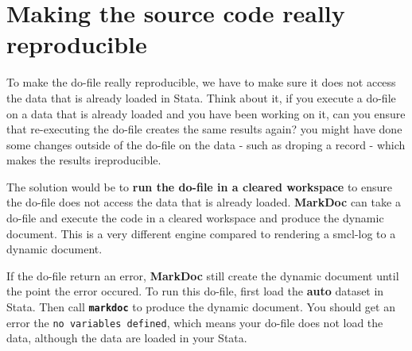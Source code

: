 \documentclass{article}
\begin{document}
\section{Making the source code really
reproducible}\label{making-the-source-code-really-reproducible}

To make the do-file really reproducible, we have to make sure it does
not access the data that is already loaded in Stata. Think about it, if
you execute a do-file on a data that is already loaded and you have been
working on it, can you ensure that re-executing the do-file creates the
same results again? you might have done some changes outside of the
do-file on the data - such as droping a record - which makes the results
ireproducible.

The solution would be to \textbf{run the do-file in a cleared workspace}
to ensure the do-file does not access the data that is already loaded.
\textbf{MarkDoc} can take a do-file and execute the code in a cleared
workspace and produce the dynamic document. This is a very different
engine compared to rendering a smcl-log to a dynamic document.

If the do-file return an error, \textbf{MarkDoc} still create the
dynamic document until the point the error occured. To run this do-file,
first load the \textbf{auto} dataset in Stata. Then call
\textbf{\texttt{markdoc}} to produce the dynamic document. You should
get an error the \texttt{no\ variables\ defined}, which means your
do-file does not load the data, although the data are loaded in your
Stata.
\end{document}
